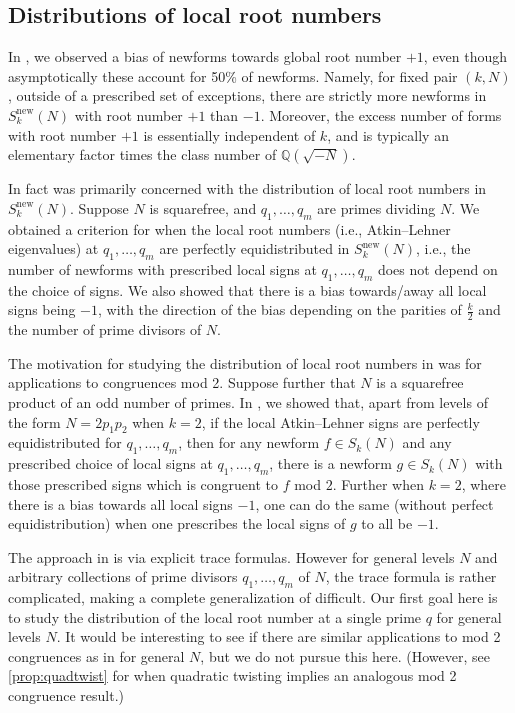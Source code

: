 \documentclass[11pt]{amsart}
\newcommand{\Q}{\mathbb Q}
\newcommand{\new}{\mathrm{new}}
\numberwithin{lem}{section}
\theoremstyle{remark}
\theoremstyle{definition}
\numberwithin{equation}{section}
\begin{document}
\subsection{Distributions of local root numbers}

In \cite{me:refdim,me:rootno}, we observed a bias of newforms towards global root number $+1$, even though asymptotically these account for 50\% of newforms.  Namely, for fixed pair $(k, N)$, outside of a prescribed set of exceptions, there are strictly more newforms in $S^\new_k(N)$ with root number $+1$ than $-1$.  Moreover, the excess number of forms with root number $+1$ is essentially independent of $k$, and is typically an elementary factor times the class number of $\Q(\sqrt{-N})$.

In fact \cite{me:refdim} was primarily concerned with the distribution of local root numbers in $S_k^\new(N)$.  Suppose $N$ is squarefree, and $q_1, \dots, q_m$ are primes dividing $N$.  We obtained a criterion for when the local root numbers (i.e., Atkin--Lehner eigenvalues) at $q_1, \dots, q_m$  are perfectly equidistributed in $S_k^\new(N)$, i.e., the number of newforms with prescribed local signs at $q_1, \dots, q_m$ does not depend on the choice of signs.  We also showed that there is a bias towards/away all local signs being $-1$, with the direction of the bias depending on the parities of $\frac k2$ and the number of prime divisors of $N$.

The motivation for studying the distribution of local root numbers in \cite{me:refdim} was for applications to congruences mod 2.  Suppose further that $N$ is a squarefree product of an odd number of primes.  In \cite{me:cong2}, we showed that, apart from levels of the form $N = 2p_1 p_2$ when $k=2$, if the local Atkin--Lehner signs are perfectly equidistributed for $q_1, \dots, q_m$, then for any newform $f \in S_k(N)$ and any prescribed choice of local signs at $q_1, \dots, q_m$, there is a newform $g \in S_k(N)$ with those prescribed signs which is congruent to $f$ mod $2$.  Further when $k=2$, where there is a bias towards all local signs $-1$, one can do the same (without perfect equidistribution) when one prescribes the local signs of $g$ to all be $-1$. 

The approach in \cite{me:refdim,me:rootno} is via explicit trace formulas.  However for general levels $N$ and arbitrary collections of prime divisors $q_1, \dots, q_m$ of $N$, the trace formula is rather complicated, making a complete generalization of \cite{me:refdim} difficult.  Our first goal here is to study the distribution of the local root number at a single prime $q$ for general levels $N$.  It would be interesting to see if there are similar applications to mod 2 congruences as in \cite{me:cong2} for general $N$, but we do not pursue this here.  (However, see \cref{prop:quadtwist} for when quadratic twisting implies an analogous mod 2 congruence result.)
\end{document}
